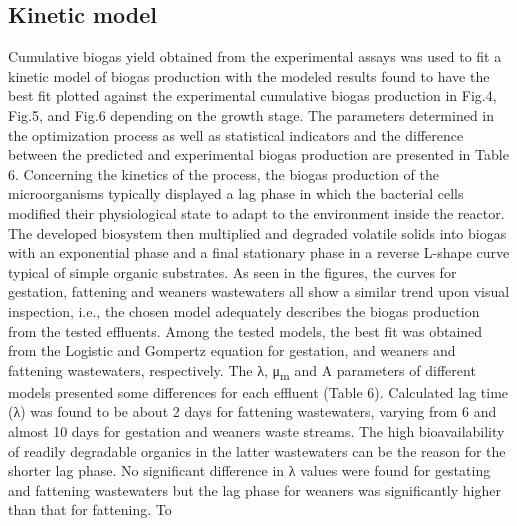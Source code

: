 \subsection{Kinetic model}
Cumulative biogas yield obtained from the experimental assays was used to fit a kinetic model of biogas production with the modeled results found to have the best fit plotted against the experimental cumulative biogas production in Fig.4, Fig.5, and Fig.6 depending on the growth stage. The parameters determined in the optimization process as well as statistical indicators and the difference between the predicted and experimental biogas production are presented in Table 6.
Concerning the kinetics of the process, the biogas production of the microorganisms typically displayed a lag phase in which the bacterial cells modified their physiological state to adapt to the environment inside the reactor. The developed biosystem then multiplied and degraded volatile solids into biogas with an exponential phase and a final stationary phase in a reverse L-shape curve typical of simple organic substrates. As seen in the figures, the curves for gestation, fattening and weaners wastewaters all show a similar trend upon visual inspection, i.e., the chosen model adequately describes the biogas production from the tested effluents. Among the tested models, the best fit was obtained from the Logistic and Gompertz equation for gestation, and weaners and fattening wastewaters, respectively. The λ, μ\textsubscript{m} and A  parameters of different models presented some differences for each effluent (Table 6). Calculated lag time (λ) was found to be about 2 days for fattening wastewaters, varying from 6 and almost 10 days for gestation and weaners waste streams. The high bioavailability of readily degradable organics in the latter wastewaters can be the reason for the shorter lag phase. No significant difference in λ values were found for gestating and fattening wastewaters but the lag phase for weaners was significantly higher than that for fattening. To